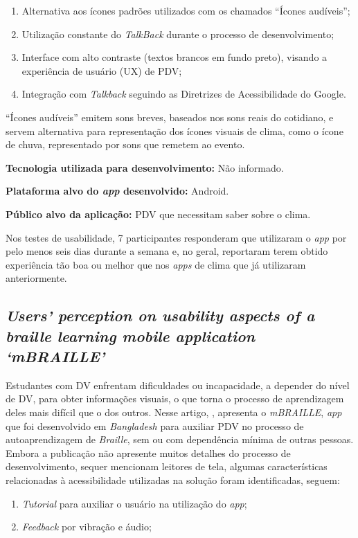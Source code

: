\begin{enumerate}
    \item Alternativa aos ícones padrões utilizados com os chamados ``Ícones audíveis'';
    \item Utilização constante do \emph{TalkBack} durante o processo de desenvolvimento;
    \item Interface com alto contraste (textos brancos em fundo preto), visando a experiência de usuário (UX) de PDV\@;
    \item Integração com \emph{Talkback} seguindo as Diretrizes de Acessibilidade do Google.
\end{enumerate}

``Ícones audíveis'' emitem sons breves, baseados nos sons reais do cotidiano, e servem alternativa para representação dos ícones visuais de clima, como o ícone de chuva, representado por sons que remetem ao evento.

\textbf{Tecnologia utilizada para desenvolvimento:} Não informado.

\textbf{Plataforma alvo do \emph{app} desenvolvido:} Android.

\textbf{Público alvo da aplicação:} PDV que necessitam saber sobre o clima\@.

Nos testes de usabilidade, 7 participantes responderam que utilizaram o \emph{app} por pelo menos seis dias durante a semana e, no geral, reportaram terem obtido experiência tão boa ou melhor que nos \emph{apps} de clima que já utilizaram anteriormente.

\subsection{\emph{Users’ perception on usability aspects of a braille learning mobile application ‘mBRAILLE’}}

Estudantes com DV enfrentam dificuldades ou incapacidade, a depender do nível de DV, para obter informações visuais, o que torna o processo de aprendizagem deles mais difícil que o dos outros.
Nesse artigo, , apresenta o \emph{mBRAILLE}, \emph{app} que foi desenvolvido em \emph{Bangladesh} para auxiliar PDV no processo de autoaprendizagem de \emph{Braille}, sem ou com dependência mínima de outras pessoas.
Embora a publicação não apresente muitos detalhes do processo de desenvolvimento, sequer mencionam leitores de tela, algumas características relacionadas à acessibilidade utilizadas na solução foram identificadas, seguem:

\begin{enumerate}
    \item \emph{Tutorial} para auxiliar o usuário na utilização do \emph{app};
    \item \emph{Feedback} por vibração e áudio;
\end{enumerate}


